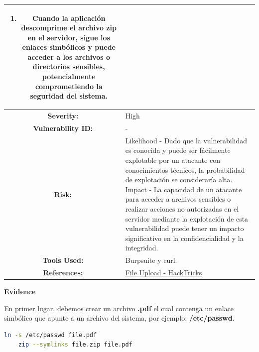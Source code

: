 \documentclass[a4paper]{article} %
\begin{document}
\begin{table}[htbp]
\begin{tabularx}{\textwidth}{|c|X|}
{\begin{enumerate}[label=\textit{\arabic*.}]
                \item Cuando la aplicación descomprime el archivo zip en el servidor, sigue los enlaces simbólicos y puede acceder a los archivos o directorios sensibles, potencialmente comprometiendo la seguridad del sistema.
                \end{enumerate}
            } \\
            \hline
            \cellcolor{lightgray}\textbf{Severity:} &
            {
                High
            } \\
            \hline
            \cellcolor{lightgray}\textbf{Vulnerability ID:} &
            {-} \\
            \hline
            \cellcolor{lightgray}\textbf{Risk:} &
            {
                Likelihood - Dado que la vulnerabilidad es conocida y puede ser fácilmente explotable por un atacante con conocimientos técnicos, la probabilidad de explotación se consideraría alta.
                \newline
                Impact - La capacidad de un atacante para acceder a archivos sensibles o realizar acciones no autorizadas en el servidor mediante la explotación de esta vulnerabilidad puede tener un impacto significativo en la confidencialidad y la integridad.
            } \\
            \hline
            \cellcolor{lightgray}\textbf{Tools Used:} &
            {
                Burpsuite y curl.
            } \\
            \hline
            \cellcolor{lightgray}\textbf{References:} &        
            {
                \href{https://book.hacktricks.xyz/pentesting-web/file-upload\#zip-tar-file-automatically-decompressed-upload}{File Upload - HackTricks}
            } \\
            \hline
        \end{tabularx}
    \end{table}

    \textbf{Evidence}

    En primer lugar, debemos crear un archivo \textbf{.pdf} el cual contenga un enlace simbólico que apunte a un archivo del sistema, por ejemplo: \textbf{/etc/passwd}.
    
    \vspace{0.2cm}

    \begin{lstlisting}[language=bash, caption=Creación del archivo pdf]
    ln -s /etc/passwd file.pdf
    zip --symlinks file.zip file.pdf
    \end{lstlisting}
    
\end{document}
